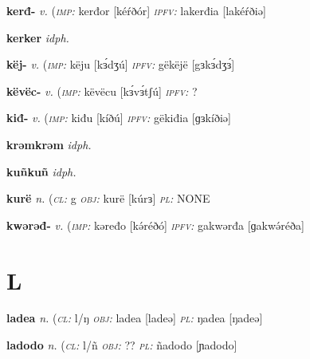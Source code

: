 \newentry
\headword\textbf{kerđ-}  
\ipa{[kérð-]}
\synpos\textit{v.} 
\imperative(\textit {\textsc{imp:}} kerđor [kéŕðór]
\imperfective\textit{\textsc{ipfv:}} lakerđia [lakéŕðiə] 


\newentry
\headword\textbf{kerker}  
\ipa{[kéŕkéŕ]}
\synpos\textit{idph.} 


\newentry
\headword\textbf{këj-}  
\ipa{[kɜ́dʒ-]}
\synpos\textit{v.} 
\imperative(\textit {\textsc{imp:}} këju [kɜ́dʒú]
\imperfective\textit{\textsc{ipfv:}} gëkëjë [gɜkɜ́dʒɜ́] 

\newentry
\headword\textbf{këvëc-}  
\ipa{[kɜ́vɜ́tʃ-]}
\synpos\textit{v.} 
\imperative(\textit {\textsc{imp:}} këvëcu [kɜ́vɜ́tʃú]
\imperfective\textit{\textsc{ipfv:}} ? %

\newentry
\headword\textbf{kiđ-}  
\ipa{[kíð-]}
\synpos\textit{v.} 
\imperative(\textit {\textsc{imp:}} kiđu [kíðú]
\imperfective\textit{\textsc{ipfv:}} gëkiđia [ɡɜkíðiə] 

\newentry
\headword\textbf{krəmkrəm}  
\synpos\textit{idph.} 


\newentry
\headword\textbf{kuñkuñ}  
\ipa{[kuɲkuɲ]}
\synpos\textit{idph.} 

\newentry
\headword\textbf{kurë} 
\ipa{[kúrɜ]}
\synpos\textit{n.} 
\class(\textit{\textsc{cl:}} {g}
\object\textit{\textsc{obj:}} kurë [kúrɜ]
\plural\textit{\textsc{pl:}} NONE


\newentry
\headword\textbf{kwərəđ-}  
\ipa{[kwərəð-]}
\synpos\textit{v.} 
\imperative(\textit {\textsc{imp:}} kəređo [kə́réðó] %
\imperfective\textit{\textsc{ipfv:}} gakwərđa [ɡakwə́réða] 


\section*{L}\label{L}

\newentry
\headword\textbf{ladea} 
\ipa{[ladeə]}
\synpos\textit{n.} 
\class(\textit{\textsc{cl:}} {l/ŋ}
\object\textit{\textsc{obj:}} ladea [ladeə]
\plural\textit{\textsc{pl:}} ŋadea [ŋadeə]

\newentry
\headword\textbf{ladodo} 
\ipa{[ladodo]}
\synpos\textit{n.} 
\class(\textit{\textsc{cl:}} {l/ñ}
\object\textit{\textsc{obj:}} ??
\plural\textit{\textsc{pl:}} ñadodo [ɲadodo]


